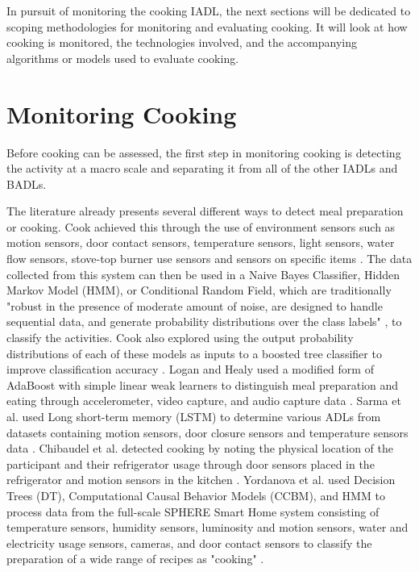 In pursuit of monitoring the cooking IADL, the next sections will be dedicated to scoping methodologies for monitoring and evaluating cooking. It will look at how cooking is monitored, the technologies involved, and the accompanying algorithms or models used to evaluate cooking.

\section{Monitoring Cooking}\label{sec:monitoring-cooking}
Before cooking can be assessed, the first step in monitoring cooking is detecting the activity at a macro scale and separating it from all of the other IADLs and BADLs. 

The literature already presents several different ways to detect meal preparation or cooking. Cook achieved this through the use of environment sensors such as motion sensors, door contact sensors, temperature sensors, light sensors, water flow sensors, stove-top burner use sensors and sensors on specific items \cite{cook_learning_2010}. The data collected from this system can then be used in a Naive Bayes Classifier, Hidden Markov Model (HMM), or Conditional Random Field, which are traditionally "robust in the presence of moderate amount of noise, are designed to handle sequential data, and generate probability distributions over the class labels" \cite{cook_learning_2010}, to classify the activities. Cook also explored using the output probability distributions of each of these models as inputs to a boosted tree classifier to improve classification accuracy \cite{cook_learning_2010}. Logan and Healy used a modified form of AdaBoost with simple linear weak learners to distinguish meal preparation and eating through accelerometer, video capture, and audio capture data \cite{logan_sensors_2006}. Sarma et al. used Long short-term memory (LSTM) to determine various ADLs from datasets containing motion sensors, door closure sensors and temperature sensors data \cite{sarma_activity_2019}. Chibaudel et al. detected cooking by noting the physical location of the participant and their refrigerator usage through door sensors placed in the refrigerator and motion sensors in the kitchen \cite{mokhtari_smart_2018}. Yordanova et al. used Decision Trees (DT), Computational Causal Behavior Models (CCBM), and HMM to process data from the full-scale SPHERE Smart Home system consisting of temperature sensors, humidity sensors, luminosity and motion sensors, water and electricity usage sensors, cameras, and door contact sensors to classify the preparation of a wide range of recipes as "cooking" \cite{yordanova_analysing_2019}.

